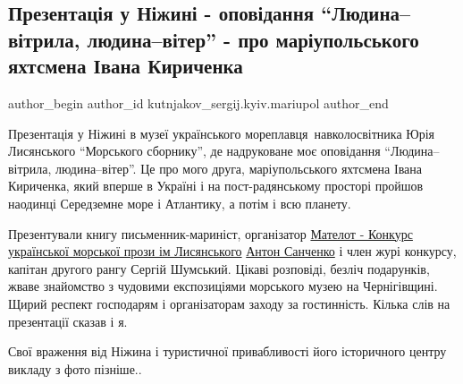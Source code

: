  
 
 
 
 

\subsection{Презентація у Ніжині - оповідання \enquote{Людина–вітрила, людина–вітер} - про маріупольського яхтсмена Івана Кириченка}
\label{sec:13_04_2023.fb.kutnjakov_sergij.kyiv.mariupol.1.nizhyn_prezentacia_opovidannja_ivan_kirichenko_jahtsmen}

\ifcmt
 author_begin
   author_id kutnjakov_sergij.kyiv.mariupol
 author_end
\fi

Презентація у Ніжині в музеї українського мореплавця~навколосвітника Юрія
Лисянського \enquote{Морського сборнику}, де надруковане моє оповідання
\enquote{Людина–вітрила, людина–вітер}. Це про мого друга, маріупольського яхтсмена
Івана Кириченка, який вперше в Україні і на пост-радянському просторі пройшов
наодинці Середземне море і Атлантику, а потім і всю планету.

Презентували книгу письменник-мариніст, організатор
\href{https://www.facebook.com/matelotUA}{Мателот - Конкурс української
морської прози ім Лисянського}
\href{https://www.facebook.com/profile.php?id=100001205690197}{Антон Санченко}
і член журі конкурсу, капітан другого рангу Сергій Шумський. Цікаві розповіді,
безліч подарунків, жваве знайомство з чудовими експозиціями морського музею на
Чернігівщині. Щирий респект господарям і організаторам заходу за гостинність.
Кілька слів на презентації сказав і я. 

Свої враження від Ніжина і туристичної привабливості його історичного центру
викладу з фото пізніше..
